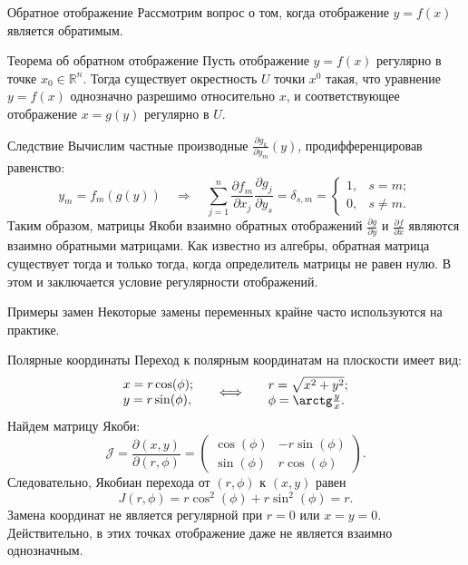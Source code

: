 \documentclass[8pt]{beamer}
\newcommand{\pp}[2]{\frac{\partial #1}{\partial #2}}
\begin{document}
\begin{frame}{Обратное отображение}
Рассмотрим вопрос о том, когда отображение $y=f(x)$ является обратимым.
\begin{block}{Теорема об обратном отображение}
Пусть отображение $y = f(x)$ регулярно в точке $x_0\in\mathbb{R}^n$. Тогда существует окрестность $U$ точки $x^0$ такая, что уравнение $y=f(x)$ однозначно разрешимо относительно $x$, и соответствующее отображение $x = g(y)$ регулярно в $U$.
\end{block}
\begin{block}{Следствие}
Вычислим частные производные $\pp{g_k}{y_m}(y)$, продифференцировав равенство:
$$y_m = f_m(g(y))
\quad \Rightarrow \quad 
 \sum_{j=1}^n \pp{f_m}{x_j}\pp{g_j}{y_s} = \delta_{s,m} =  \left\{
 \begin{array}{ll}
1,& s=m;\\
0,& s\ne m.
\end{array}\right.
$$
Таким образом, матрицы Якоби взаимно обратных отображений $\pp{g}{y}$ и $\pp{f}{x}$ являются взаимно обратными матрицами. Как известно из алгебры, обратная матрица существует тогда и только тогда, когда определитель матрицы не равен нулю. В этом и заключается условие регулярности отображений. 
\end{block}
\end{frame}

\begin{frame}{Примеры замен}
Некоторые замены переменных крайне часто используются на практике.
\begin{block}{Полярные координаты}
Переход к полярным координатам на плоскости имеет вид:
$$\begin{array}{l}
x = r \cos(\phi);\\
y = r \sin(\phi),
\end{array}
\quad\iff\quad
\begin{array}{l}
r = \sqrt{x^2+y^2};\\
\phi =\arctg\frac{y}{x}.
\end{array}
$$
Найдем матрицу Якоби:
$$\mathcal{J} = \pp{(x,y)}{(r,\phi)} = \left(\begin{array}{cc}
\cos(\phi)& -r\sin(\phi)\\
\sin(\phi)& r\cos(\phi)
\end{array}\right).$$
Следовательно, Якобиан перехода от $(r,\phi)$ к $(x,y)$ равен
$$J(r,\phi) = r \cos^2(\phi)+r\sin^2(\phi) = r.$$
Замена координат не является регулярной при $r=0$ или $x=y=0$. Действительно, в этих точках отображение даже не является взаимно однозначным.
\end{block}
\end{frame}
\end{document}
